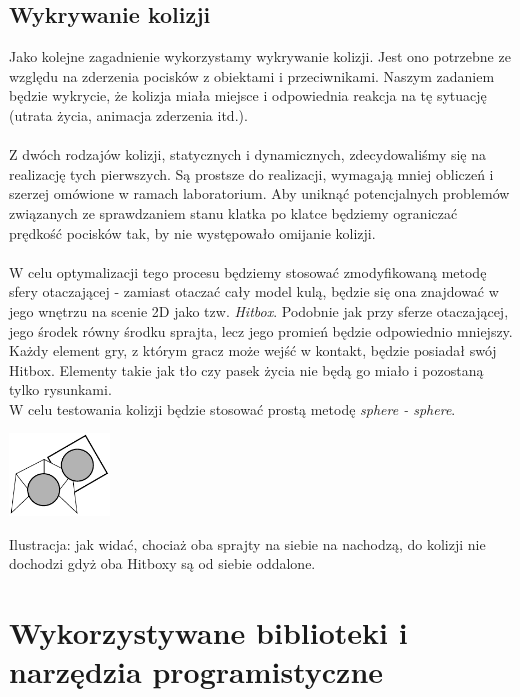\documentclass[a4paper,twoside]{article}
\begin{document}
	\subsection{Wykrywanie kolizji}
	Jako kolejne zagadnienie wykorzystamy wykrywanie kolizji. Jest ono potrzebne ze względu na zderzenia pocisków z obiektami i przeciwnikami. Naszym zadaniem będzie wykrycie, że kolizja miała miejsce i odpowiednia reakcja na tę sytuację (utrata życia, animacja zderzenia itd.).\\\\
	Z dwóch rodzajów kolizji, statycznych i dynamicznych, zdecydowaliśmy się na realizację tych pierwszych. Są prostsze do realizacji, wymagają mniej obliczeń i szerzej omówione w ramach laboratorium. Aby uniknąć potencjalnych problemów związanych ze sprawdzaniem stanu klatka po klatce będziemy ograniczać prędkość pocisków tak, by nie występowało omijanie kolizji.\\\\
	W celu optymalizacji tego procesu będziemy stosować zmodyfikowaną metodę sfery otaczającej - zamiast otaczać cały model kulą, będzie się ona znajdować w jego wnętrzu na scenie 2D jako tzw. \emph{Hitbox}. Podobnie jak przy sferze otaczającej, jego środek równy środku sprajta, lecz jego promień będzie odpowiednio mniejszy. Każdy element gry, z którym gracz może wejść w kontakt, będzie posiadał swój Hitbox. Elementy takie jak tło czy pasek życia nie będą go miało i pozostaną tylko rysunkami.\\
	W celu testowania kolizji będzie stosować prostą metodę \emph{sphere - sphere}.
	
	\begin{center}
		\includegraphics[width=0.2\textwidth]{./images/kolizja}
	\end{center}
	Ilustracja: jak widać, chociaż oba sprajty na siebie na nachodzą, do kolizji nie dochodzi gdyż oba Hitboxy są od siebie oddalone.\\
	
	\section{Wykorzystywane biblioteki i narzędzia programistyczne}
\end{document}
